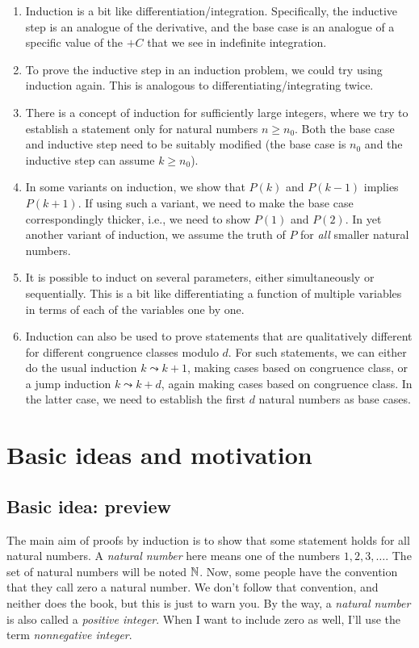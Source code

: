 \documentclass{amsart}
\begin{document}
\begin{enumerate}
\item Induction is a bit like
  differentiation/integration. Specifically, the inductive step is an
  analogue of the derivative, and the base case is an analogue of a
  specific value of the $+C$ that we see in indefinite integration.
\item To prove the inductive step in an induction problem, we could
  try using induction again. This is analogous to
  differentiating/integrating twice.
\item There is a concept of induction for sufficiently large integers,
  where we try to establish a statement only for natural numbers $n
  \ge n_0$. Both the base case and inductive step need to be suitably
  modified (the base case is $n_0$ and the inductive step can assume
  $k \ge n_0$).
\item In some variants on induction, we show that $P(k)$ and $P(k-1)$
  implies $P(k+1)$. If using such a variant, we need to make the base
  case correspondingly thicker, i.e., we need to show $P(1)$ and
  $P(2)$. In yet another variant of induction, we assume the truth of
  $P$ for {\em all} smaller natural numbers.
\item It is possible to induct on several parameters, either
  simultaneously or sequentially. This is a bit like differentiating a
  function of multiple variables in terms of each of the variables one
  by one.
\item Induction can also be used to prove statements that are
  qualitatively different for different congruence classes modulo
  $d$. For such statements, we can either do the usual induction $k
  \leadsto k + 1$, making cases based on congruence class, or a jump
  induction $k \leadsto k + d$, again making cases based on congruence
  class. In the latter case, we need to establish the first $d$
  natural numbers as base cases.
\end{enumerate}
\section{Basic ideas and motivation}

\subsection{Basic idea: preview}

The main aim of proofs by induction is to show that some statement
holds for all natural numbers. A {\em natural number} here means one
of the numbers $1,2,3,\dots$. The set of natural numbers will be noted
$\mathbb{N}$. Now, some people have the convention that they call zero a
natural number. We don't follow that convention, and neither does the
book, but this is just to warn you. By the way, a {\em natural number}
is also called a {\em positive integer}. When I want to include zero
as well, I'll use the term {\em nonnegative integer}.
\end{document}
